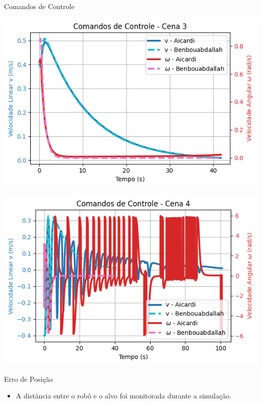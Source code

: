 \documentclass{beamer}
\begin{document}
\begin{frame}{Comandos de Controle}
\begin{minipage}{0.48\linewidth}
    \centering
    \includegraphics[width=\linewidth]{Figuras/Controle_Cena_3.png}
  \end{minipage}
  \hfill
  \begin{minipage}{0.48\linewidth}
    \centering
    \includegraphics[width=\linewidth]{Figuras/Controle_Cena_4.png}
  \end{minipage}
\end{frame}

\begin{frame}{Erro de Posição}
  \begin{itemize}
    \item A distância entre o robô e o alvo foi monitorada durante a simulação.
  \end{itemize}
\end{frame}
\end{document}
